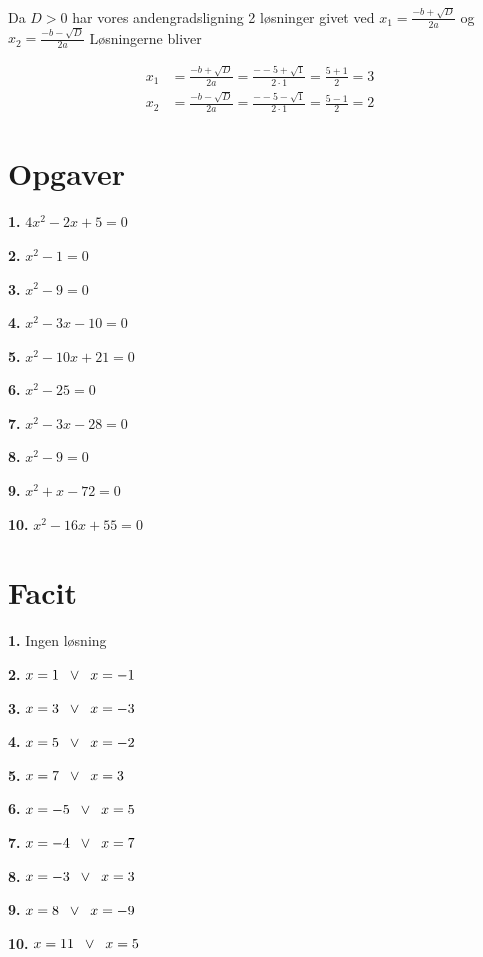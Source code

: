 Da $D > 0$ har vores andengradsligning 2 løsninger givet ved $x_1 = \frac{-b + \sqrt{D}}{2a}$ og $x_2 = \frac{-b-\sqrt{D}}{2a}$
Løsningerne bliver

\begin{align*}
x_1 &= \frac{-b + \sqrt{D}}{2a} = \frac{--5 + \sqrt{1}}{2\cdot 1} = \frac{5 + 1}{2} = 3\\
x_2 &= \frac{-b - \sqrt{D}}{2a} = \frac{--5 - \sqrt{1}}{2\cdot 1} = \frac{5 - 1}{2} = 2
\end{align*}


\section*{Opgaver}

\textbf{1.} $4x^2 -2x + 5 = 0$

\textbf{2.} $x^2 - 1 = 0$

\textbf{3.} $x^2 - 9 = 0$

\textbf{4.} $x^2 - 3x - 10 = 0$

\textbf{5.} $x^2 - 10x + 21 = 0$

\textbf{6.} $x^2 - 25 = 0$

\textbf{7.} $ x^2 -3x - 28= 0$

\textbf{8.} $x^2 - 9 = 0$

\textbf{9.} $x^2 + x - 72= 0$

\textbf{10.} $x^2 - 16x + 55 = 0$

\newpage

\section*{Facit}

\textbf{1.} Ingen løsning

\textbf{2.} $x = 1\hspace*{2mm} \vee \hspace*{2mm} x = -1$

\textbf{3.} $x = 3\hspace*{2mm} \vee \hspace*{2mm} x = -3$

\textbf{4.} $x = 5\hspace*{2mm} \vee \hspace*{2mm} x = -2$

\textbf{5.} $x = 7\hspace*{2mm} \vee \hspace*{2mm} x = 3$

\textbf{6.} $x = -5\hspace*{2mm} \vee \hspace*{2mm} x = 5$

\textbf{7.} $x = -4\hspace*{2mm} \vee \hspace*{2mm} x = 7$

\textbf{8.} $x = -3\hspace*{2mm} \vee \hspace*{2mm} x = 3$

\textbf{9.} $x = 8\hspace*{2mm} \vee \hspace*{2mm} x = -9$

\textbf{10.} $x = 11\hspace*{2mm} \vee \hspace*{2mm} x = 5$
